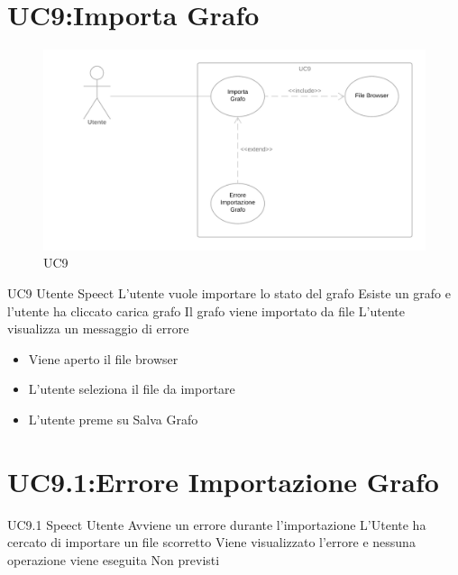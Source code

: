 \documentclass[../AnalisideiRequisiti.tex]{subfiles}
\begin{document}
\section{UC9:Importa Grafo}
\begin{figure}[htp]
	\caption{UC9}
	\centering
	\includegraphics[width=\textwidth]{../img/UC09.png}
\end{figure}
\UserCase
{UC9}
{Utente}
{Speect}
{L'utente vuole importare lo stato del grafo}
{Esiste un grafo e l'utente ha cliccato carica grafo}
{Il grafo viene importato da file}
{L'utente visualizza un messaggio di errore }
{
	{\begin{itemize}
			\item{} Viene aperto il file browser
			\item{} L'utente seleziona il file da importare
			\item{} L'utente preme su Salva Grafo
\end{itemize}}}
\section{UC9.1:Errore Importazione Grafo}
\UserCase
{UC9.1}
{Speect}
{Utente}
{Avviene un errore durante l'importazione}
{L'Utente ha cercato di importare un file scorretto}
{Viene visualizzato l'errore e nessuna operazione viene eseguita}
{Non previsti}
{}
\end{document}
